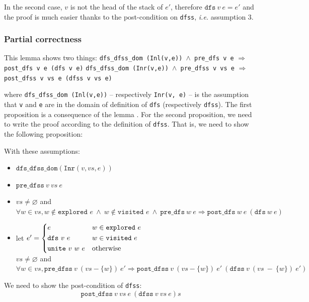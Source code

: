 \documentclass[a4 paper, 12pt]{article}
\begin{document}
{In the second case, $v$ is not the head of the stack of $e'$, therefore $\texttt{dfs}~v~e = e'$ and the proof is much easier thanks to the post-condition on \texttt{dfss}, \textit{i.e.} assumption 3.

\subsubsection{Partial correctness}
This lemma shows two things:
\BlankLine
\noindent
\texttt{dfs\_dfss\_dom (Inl(v,e)) $\land$ pre\_dfs v e} $\Longrightarrow$ \texttt{post\_dfs v e (dfs v e)}
\BlankLine
\noindent
\texttt{dfs\_dfss\_dom (Inr(v,e)) $\land$ pre\_dfss v vs e} $\Longrightarrow$ \texttt{post\_dfss v vs e (dfss v vs e)}

\BlankLine
\noindent
where \texttt{dfs\_dfss\_dom (Inl(v,e))} -- respectively \texttt{Inr(v, e)} -- is the assumption that \texttt{v} and \texttt{e} are in the domain of definition of \texttt{dfs} (respectively \texttt{dfss}).
\BlankLine
The first proposition is a consequence of the lemma .
\BlankLine
For the second proposition, we need to write the proof according to the definition of \texttt{dfss}. That is, we need to show the following proposition:

\BlankLine

With these assumptions:
\begin{itemize}
    \item $\texttt{dfs\_dfss\_dom} (\texttt{Inr}(v,vs,e))$
    \item $\texttt{pre\_dfss}~v~vs~e$
    \item $vs \neq \varnothing$ and \\$\forall w \in vs,  w \notin \texttt{explored } e~\land~w \notin \texttt{visited } e~\land~\texttt{pre\_dfs}~w~e \Longrightarrow \texttt{post\_dfs}~w~e~(\texttt{dfs}~w~e)$
    \item let $e' =
    \begin{dcases}
		e & w \in \texttt{explored}~e \\
		\texttt{dfs}~v~e & w \in \texttt{visited}~e \\
        \texttt{unite}~v~w~e & \text{otherwise}
	\end{dcases}$\\
    $vs \neq \varnothing$ and \\$\forall w \in vs, \texttt{pre\_dfss}~v~(vs - \{w\})~e' \Longrightarrow \texttt{post\_dfss}~v~(vs - \{w\})~e'~(\texttt{dfss}~v~(vs~-~\{w\})~e')$
\end{itemize}
\noindent
We need to show the post-condition of \texttt{dfss}:
\begin{equation*}
    \texttt{post\_dfss}~v~vs~e~(\texttt{dfss}~v~vs~e)s
\end{equation*}

}
\end{document}
